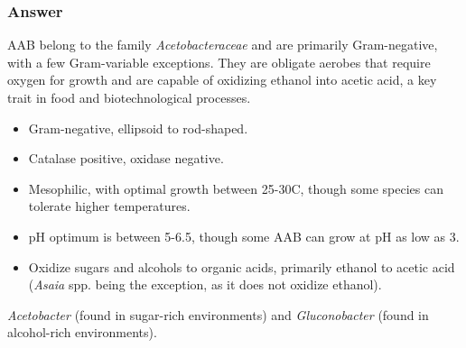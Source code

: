 \subsubsection*{Answer}
AAB belong to the family \textit{Acetobacteraceae} and are primarily Gram-negative, with a few Gram-variable exceptions. They are obligate aerobes that require oxygen for growth and are capable of oxidizing ethanol into acetic acid, a key trait in food and biotechnological processes.

\begin{itemize}
    \item Gram-negative, ellipsoid to rod-shaped.
    \item Catalase positive, oxidase negative.
    \item Mesophilic, with optimal growth between 25-30\textdegree C, though some species can tolerate higher temperatures.
    \item pH optimum is between 5-6.5, though some AAB can grow at pH as low as 3.
    \item Oxidize sugars and alcohols to organic acids, primarily ethanol to acetic acid (\textit{Asaia} spp. being the exception, as it does not oxidize ethanol).
\end{itemize}

\textit{Acetobacter} (found in sugar-rich environments) and \textit{Gluconobacter} (found in alcohol-rich environments).

